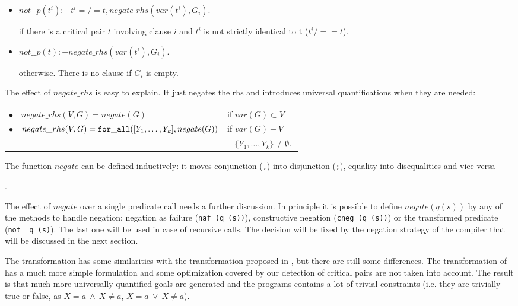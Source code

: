 \documentclass[]{llncs}
\newenvironment{mytabbing}
   {\vspace{0.3em}\begin{small}\begin{tabbing}}
   {\end{tabbing}\end{small}\vspace{0.3em}}
\begin{document}
\begin{itemize}
\item \begin{mytabbing}
$not\_\_p (t^i) :- t^i =/= t, negate\_rhs (var (t^i), G_i)$.
\end{mytabbing}

\noindent
if there is a critical pair $t$ involving clause $i$ and $t^i$ is not
strictly identical to t ($t^i /==t$).

\item \begin{mytabbing}
$not\_\_p (t) :- negate\_rhs (var (t^i), G_i)$.
\end{mytabbing}

\noindent
otherwise. There is no clause if $G_i$ is empty.
\end{itemize}

The effect of $negate\_rhs$ is easy to explain. It just
negates the rhs and introduces universal quantifications when
they are needed:

\begin{tabular}{lll}
$\bullet$ &  $negate\_rhs (V, G) = negate (G)$ & if $var (G) \subset V$\\
$\bullet$ &  $negate\_rhs (V, G) =
            {\tt for\_all} ([Y_1, \ldots, Y_k], negate (G))$ &  if $var
            (G) - V =$\\
& & $ ~~~~\{Y_1, \ldots, Y_k\} \neq \emptyset$.   
\end{tabular}

The function $negate$ can be defined inductively: it moves conjunction
({\tt ,}) into disjunction ({\tt ;}), equality into disequalities and vice versa

.

The effect of
$negate$ over a single predicate call needs a further discussion.
In principle it is possible to define $negate (q (s))$ by any of
the methods to handle negation: negation as failure
({\tt naf (q (s))}), constructive negation ({\tt cneg (q (s))}) or
the transformed predicate ({\tt not\_\_q (s)}). The last one
will be used in case of recursive calls. The decision will
be fixed by the negation strategy of the compiler that will
be discussed in the next section.

The transformation has some similarities with the transformation
proposed in \cite{Bruscoli}, but there are still 
some differences. The transformation
of \cite{Bruscoli} has a much more simple formulation and some
optimization covered by our detection of critical pairs are
not taken into account. The result is that much more universally
quantified goals are generated and the programs contains a lot
of trivial constraints (i.e. they are trivially true or false,
as $X = a ~\wedge~ X \neq a$, $X = a ~\vee~ X \neq a$).
\end{document}
